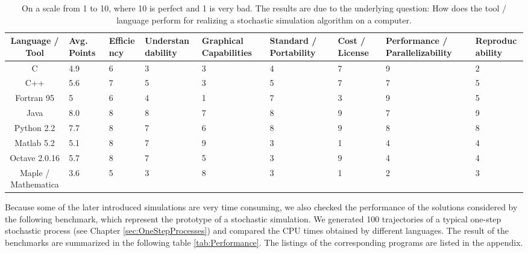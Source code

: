 \begin{landscape}
\begin{table}[htbp]
\begin{tabular}{|c|p{1cm}||p{2cm}|p{2cm}|p{2cm}|p{2cm}|p{2cm}|p{2cm}|p{2cm}|}
\hline
Language / Tool & Avg. Points &
Efficiency & Under\-standa\-bility & Graphical Capabilities &
Standard / Portability & Cost / License & Performance / Parallelizability &
Reproducability \\\hline
C          & 4.9 & 6 & 3 & 3 & 4 & 7 & 9 & 2 \\\hline
C++        & 5.6 & 7 & 5 & 3 & 5 & 7 & 7 & 5 \\\hline
Fortran 95 & 5 & 6 & 4 & 1 & 7 & 3 & 9 & 5 \\\hline\hline
Java       & 8.0 & 8 & 8 & 7 & 8 & 9 & 7 & 9 \\\hline
Python 2.2 & 7.7 & 8 & 7 & 6 & 8 & 9 & 8 & 8 \\\hline\hline
Matlab 5.2          & 5.1 & 8 & 7 & 9 & 3 & 1 & 4 & 4 \\\hline
Octave 2.0.16       & 5.7 & 8 & 7 & 5 & 3 & 9 & 4 & 4 \\\hline\hline
Maple / Mathematica & 3.6 & 5 & 3 & 8 & 3 & 1 & 2 & 3 \\\hline
\end{tabular}

\caption{On a scale from 1 to 10, where 10 is perfect and 1 is very bad.
The results are due to the underlying question: How does the tool / language
perform for realizing a stochastic simulation algorithm on a computer.}
\end{table}
\end{landscape}

Because some of the later introduced simulations are very time consuming,
we also checked the performance of the solutions considered by the 
following benchmark, which represent the prototype of a stochastic simulation. 
We generated 100 trajectories of a typical one-step stochastic process
(see Chapter \ref{sec:OneStepProcesses})
and compared the CPU times obtained by different languages. The result
of the benchmarks are summarized in the following table \ref{tab:Performance}. 
The listings
of the corresponding programs are listed in the appendix.

